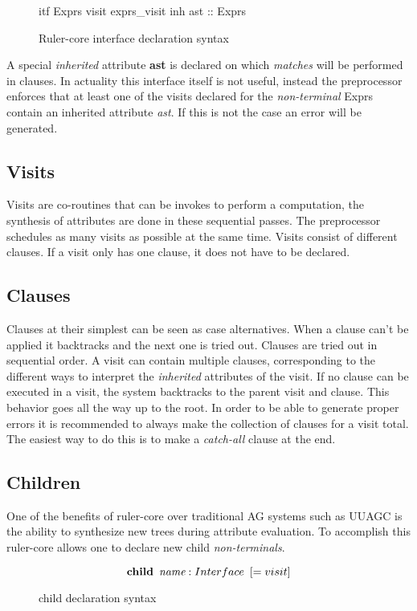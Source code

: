 \begin{figure}[h!]
\begin{code}
itf Exprs
  visit exprs_visit
    inh ast :: Exprs
\end{code}
\caption{Ruler-core interface declaration syntax}
\label{itf:exprs}
\end{figure}

A special \emph{inherited} attribute \textbf{ast} is declared on which \emph{matches} will be performed in clauses. In actuality this interface itself is not useful, instead the preprocessor enforces that at least one of the visits declared for the \emph{non-terminal} Exprs contain an inherited attribute \emph{ast}. If this is not the case an error will be generated.
\subsection{Visits}
Visits are co-routines that can be invokes to perform a computation, the synthesis of attributes are done in these sequential passes. The preprocessor schedules as many visits as possible at the same time. Visits consist of different clauses. If a visit only has one clause, it does not have to be declared. 
\subsection{Clauses}
Clauses at their simplest can be seen as case alternatives. When a clause can't be applied it backtracks and the next one is tried out. Clauses are tried out in sequential order.
A visit can contain multiple clauses, corresponding to the different ways to interpret the \emph{inherited} attributes of the visit.
If no clause can be executed in a visit, the system backtracks to the parent visit and clause. This behavior goes all the way up to the root. In order to be able to generate proper errors it is recommended to always make the collection of clauses for a visit total. The easiest way to do this is to make a \emph{catch-all} clause at the end.
\subsection{Children}
One of the benefits of ruler-core over traditional AG systems such as UUAGC is the ability to synthesize new trees during attribute evaluation. To accomplish this ruler-core allows one to declare new child \emph{non-terminals}.

\begin{figure}[h!]
\[
\textbf{child} \hspace{5pt} \emph{name} : Interface \hspace{5pt} [= visit]
\]
\caption{child declaration syntax}
\end{figure}

